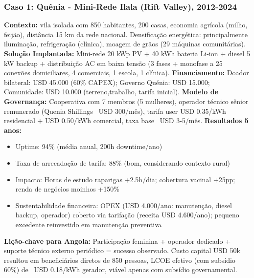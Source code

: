 \documentclass[12pt, a4paper]{article}
\begin{document}
\subsubsection{Caso 1: Quênia - Mini-Rede Ilala (Rift Valley), 2012-2024}
\textbf{Contexto:} vila isolada com 850 habitantes, 200 casas, economia agrícola (milho, feijão), distância 15 km da rede nacional. Densificação energética: principalmente iluminação, refrigeração (clínica), moagem de grãos (29 máquinas comunitárias).
\textbf{Solução Implantada:} Mini-rede 20 kWp PV + 40 kWh bateria Li-ion + diesel 5 kW backup + distribuição AC em baixa tensão (3 fases + monofase a 25 conexões domiciliares, 4 comerciais, 1 escola, 1 clínica).
\textbf{Financiamento:} Doador bilateral: USD 45.000 (60\% CAPEX); Governo Quénia: USD 15.000; Comunidade: USD 10.000 (terreno,trabalho, tarifa inicial).
\textbf{Modelo de Governança:} Cooperativa com 7 membros (5 mulheres), operador técnico sênior remunerado (Quenia Shillings ~USD 300/mês), tarifa user USD 0.35/kWh residencial + USD 0.50/kWh comercial, taxa base ~USD 3-5/mês.
\textbf{Resultados 5 anos:}
\begin{itemize}
\item Uptime: 94\% (média anual, 200h downtime/ano)
\item Taxa de arrecadação de tarifa: 88\% (bom, considerando contexto rural)
\item Impacto: Horas de estudo raparigas +2.5h/dia; cobertura vacinal +25pp; renda de negócios moinhos +150\%
\item Sustentabilidade financeira: OPEX (USD 4.000/ano: manutenção, diesel backup, operador) coberto via tarifação (receita USD 4.600/ano); pequeno excedente reinvestido em manutenção preventiva
\end{itemize}\textbf{Lição-chave para Angola:} Participação feminina + operador dedicado + suporte técnico externo periódico = sucesso observado. Custo capital USD 50k resultou em beneficiários diretos de 850 pessoas, LCOE efetivo (com subsídio 60\%) de ~USD 0.18/kWh gerador, viável apenas com subsídio governamental.
\end{document}
